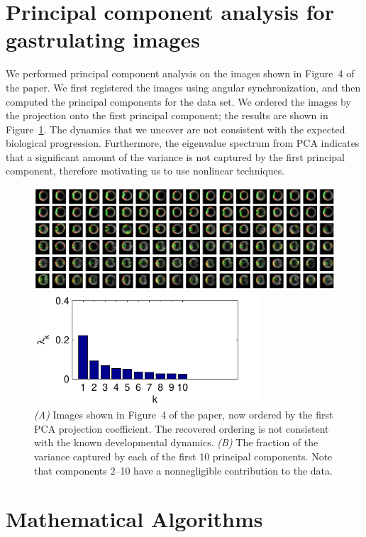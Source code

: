 \documentclass[12pt]{article}
\begin{document}
\section{Principal component analysis for gastrulating images}

We performed principal component analysis on the images shown in Figure~4 of the paper.
%
We first registered the images using angular synchronization, and then computed the principal components for the data set.
%
We ordered the images by the projection onto the first principal component; the results are shown in Figure~\ref{fig:PCA_results}.
%
The dynamics that we uncover are not consistent with the expected biological progression.
%
Furthermore, the eigenvalue spectrum from PCA indicates that a significant amount of the variance is not captured by the first principal component, therefore motivating us to use nonlinear techniques. 

\begin{figure}[h!]
\includegraphics[width=16.8cm]{data2_PCA_ordered}

\includegraphics[width=8.4cm]{data2_PCA_variance}
\caption{{\it (A)} Images shown in Figure~4 of the paper, now ordered by the first PCA projection coefficient. The recovered ordering is not consistent with the known developmental dynamics. {\it (B)} The fraction of the variance captured by each of the first 10 principal components. Note that components 2--10 have a nonnegligible contribution to the data.}
\label{fig:PCA_results}
\end{figure}

\section{Mathematical Algorithms}
\end{document}
